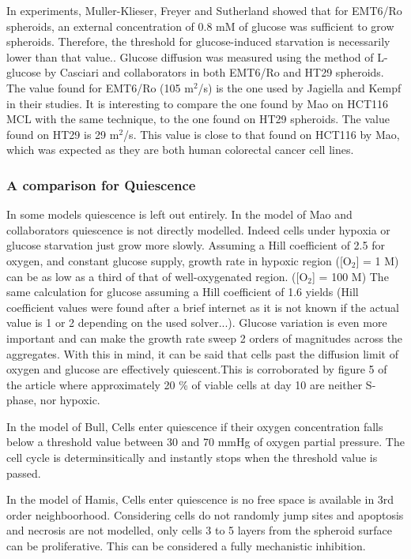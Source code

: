 \documentclass[11pt,a4paper]{article}
\begin{document}
In experiments, Muller-Klieser, Freyer and Sutherland showed that for EMT6/Ro spheroids, an external concentration of 0.8 mM of glucose was sufficient to grow spheroids. Therefore, the threshold for glucose-induced starvation is necessarily lower than that value.\cite{Freyer1986}\cite{MullerKlieser1986}. Glucose diffusion was measured using the method of L-glucose by Casciari and collaborators in both EMT6/Ro and HT29 spheroids.\cite{Casciari1988} The value found for EMT6/Ro (105 \textmu m$^2$/s) is the one used by Jagiella and Kempf in their studies. It is interesting to compare the one found by Mao on HCT116 MCL with the same technique, to the one found on HT29 spheroids. The value found on HT29 is 29 \textmu m$^2$/s. This value is close to that found on HCT116 by Mao, which was expected as they are both human colorectal cancer cell lines.%


\subsubsection{A comparison for Quiescence}
In some models quiescence is left out entirely. In the model of Mao and collaborators quiescence is not directly modelled. Indeed cells under hypoxia or glucose starvation just grow more slowly. Assuming a Hill coefficient of 2.5 for oxygen, and constant glucose supply, growth rate in hypoxic region ([O$_2$] = 1 \textmu M) can be as low as a third of that of well-oxygenated region. ([O$_2$] = 100 \textmu M) The same calculation for glucose assuming a Hill coefficient of 1.6 yields (Hill coefficient values were found after a brief internet as it is not known if the actual value is 1 or 2 depending on the used solver...). Glucose variation is even more important and can make the growth rate sweep 2 orders of magnitudes across the aggregates. With this in mind, it can be said that cells past the diffusion limit of oxygen and glucose are effectively quiescent.This is corroborated by figure 5 of the article where approximately 20 \% of viable cells at day 10 are neither S-phase, nor hypoxic.

In the model of Bull, Cells enter quiescence if their oxygen concentration falls below a threshold value between 30 and 70 mmHg of oxygen partial pressure.\cite{Bull2020} The cell cycle is determinsitically and instantly stops when the threshold value is passed. 

In the model of Hamis, Cells enter quiescence is no free space is available in 3rd order neighboorhood. Considering cells do not randomly jump sites and apoptosis and necrosis are not modelled, only cells 3 to 5 layers from the spheroid surface can be proliferative. This can be considered a fully mechanistic inhibition. 
\end{document}
